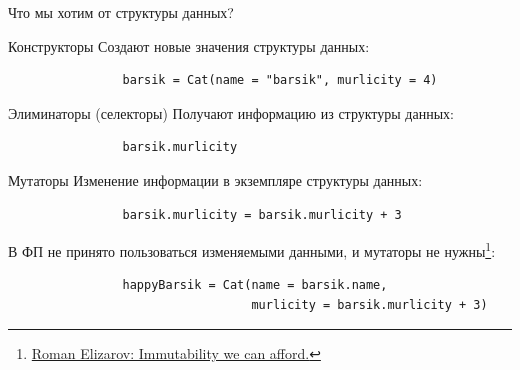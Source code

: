     \begin{frame}[fragile]{Что мы хотим от структуры данных?}
        \pause
        \vspace{-0.5em}
        \begin{block}{Конструкторы}
            Создают новые значения структуры данных:
            \begin{verbatim}
                barsik = Cat(name = "barsik", murlicity = 4)
            \end{verbatim}
        \end{block}
        \pause
        \begin{block}{Элиминаторы (селекторы)}
            Получают информацию из структуры данных:
            \begin{verbatim}
                barsik.murlicity
            \end{verbatim}
        \end{block}
        \pause
        \begin{block}{Мутаторы}
            Изменение информации в экземпляре структуры данных:
            \begin{verbatim}
                barsik.murlicity = barsik.murlicity + 3
            \end{verbatim}
            \pause
            В ФП не принято пользоваться изменяемыми данными, и мутаторы не нужны\footnote{\href{https://elizarov.medium.com/immutability-we-can-afford-10c0dcb8351d}{\color{blue} Roman Elizarov: Immutability we can afford.}}:
            \begin{verbatim}
                happyBarsik = Cat(name = barsik.name,
                                  murlicity = barsik.murlicity + 3)
            \end{verbatim}
        \end{block}
    \end{frame}

